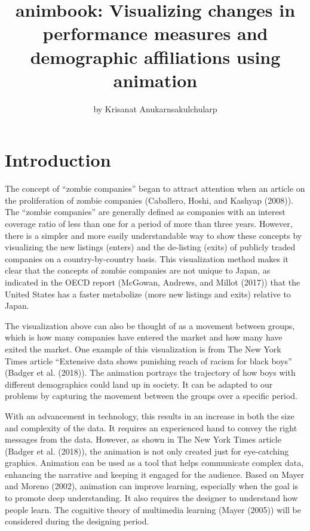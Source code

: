 \title{animbook: Visualizing changes in performance measures and demographic affiliations using animation}
\author{by Krisanat Anukarnsakulchularp}

\maketitle


\hypertarget{introduction}{%
\section{Introduction}\label{introduction}}

The concept of ``zombie companies'' began to attract attention when an article on the proliferation of zombie companies (Caballero, Hoshi, and Kashyap (2008)). The ``zombie companies'' are generally defined as companies with an interest coverage ratio of less than one for a period of more than three years. However, there is a simpler and more easily understandable way to show these concepts by visualizing the new listings (enters) and the de-listing (exits) of publicly traded companies on a country-by-country basis. This visualization method makes it clear that the concepts of zombie companies are not unique to Japan, as indicated in the OECD report (McGowan, Andrews, and Millot (2017)) that the United States has a faster metabolize (more new listings and exits) relative to Japan.

The visualization above can also be thought of as a movement between groups, which is how many companies have entered the market and how many have exited the market. One example of this visualization is from The New York Times article ``Extensive data shows punishing reach of racism for black boys'' (Badger et al. (2018)). The animation portrays the trajectory of how boys with different demographics could land up in society. It can be adapted to our problems by capturing the movement between the groups over a specific period.

With an advancement in technology, this results in an increase in both the size and complexity of the data. It requires an experienced hand to convey the right messages from the data. However, as shown in The New York Times article (Badger et al. (2018)), the animation is not only created just for eye-catching graphics. Animation can be used as a tool that helps communicate complex data, enhancing the narrative and keeping it engaged for the audience. Based on Mayer and Moreno (2002), animation can improve learning, especially when the goal is to promote deep understanding. It also requires the designer to understand how people learn. The cognitive theory of multimedia learning (Mayer (2005)) will be considered during the designing period.

